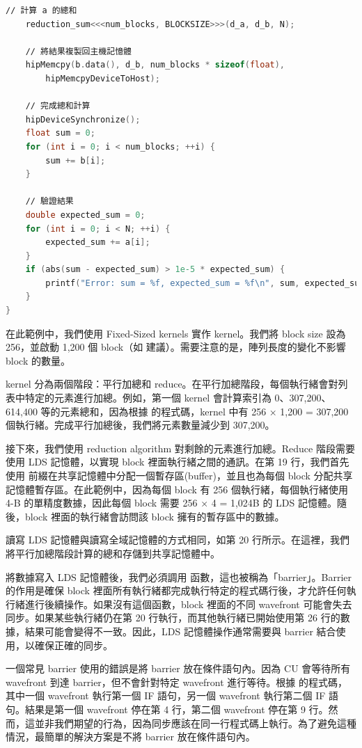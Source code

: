 \begin{lstlisting}[language=C, caption={用 HIP 實作的程式，用於計算陣列中數字的總和。}, captionpos=t, label={lst:sum}]
    ∕∕ 計算 a 的總和
    reduction_sum<<<num_blocks, BLOCKSIZE>>>(d_a, d_b, N);

    ∕∕ 將結果複製回主機記憶體
    hipMemcpy(b.data(), d_b, num_blocks * sizeof(float),
        hipMemcpyDeviceToHost);

    ∕∕ 完成總和計算
    hipDeviceSynchronize();
    float sum = 0;
    for (int i = 0; i < num_blocks; ++i) {
        sum += b[i];
    }

    ∕∕ 驗證結果
    double expected_sum = 0;
    for (int i = 0; i < N; ++i) {
        expected_sum += a[i];
    }
    if (abs(sum - expected_sum) > 1e-5 * expected_sum) {
        printf("Error: sum = %f, expected_sum = %f\n", sum, expected_sum);
    }
}
\end{lstlisting}

在此範例中，我們使用 Fixed-Sized kernels 實作  kernel。我們將 block size 設為 256，並啟動 1,200 個 block（如  建議）。需要注意的是，陣列長度的變化不影響 block 的數量。

 kernel 分為兩個階段：平行加總和 reduce。在平行加總階段，每個執行緒會對列表中特定的元素進行加總。例如，第一個 kernel 會計算索引為 0、307,200、614,400 等的元素總和，因為根據  的程式碼，kernel 中有 256 × 1,200 = 307,200 個執行緒。完成平行加總後，我們將元素數量減少到 307,200。

接下來，我們使用 reduction algorithm 對剩餘的元素進行加總。Reduce 階段需要使用 LDS 記憶體，以實現 block 裡面執行緒之間的通訊。在第 19 行，我們首先使用  前綴在共享記憶體中分配一個暫存區(buffer)，並且也為每個 block 分配共享記憶體暫存區。在此範例中，因為每個 block 有 256 個執行緒，每個執行緒使用 4-B 的單精度數據，因此每個 block 需要 256 × 4 = 1,024B 的 LDS 記憶體。隨後，block 裡面的執行緒會訪問該 block 擁有的暫存區中的數據。

讀寫 LDS 記憶體與讀寫全域記憶體的方式相同，如第 20 行所示。在這裡，我們將平行加總階段計算的總和存儲到共享記憶體中。

將數據寫入 LDS 記憶體後，我們必須調用  函數，這也被稱為「barrier」。Barrier 的作用是確保 block 裡面所有執行緒都完成執行特定的程式碼行後，才允許任何執行緒進行後續操作。如果沒有這個函數，block 裡面的不同 wavefront 可能會失去同步。如果某些執行緒仍在第 20 行執行，而其他執行緒已開始使用第 26 行的數據，結果可能會變得不一致。因此，LDS 記憶體操作通常需要與 barrier 結合使用，以確保正確的同步。

一個常見 barrier 使用的錯誤是將 barrier 放在條件語句內。因為 CU 會等待所有 wavefront 到達 barrier，但不會針對特定 wavefront 進行等待。根據  的程式碼，其中一個 wavefront 執行第一個 IF 語句，另一個 wavefront 執行第二個 IF 語句。結果是第一個 wavefront 停在第 4 行，第二個 wavefront 停在第 9 行。然而，這並非我們期望的行為，因為同步應該在同一行程式碼上執行。為了避免這種情況，最簡單的解決方案是不將 barrier 放在條件語句內。

